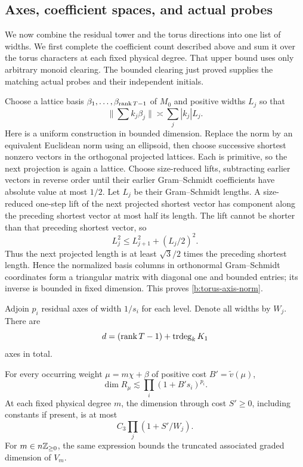 \subsection{Axes, coefficient spaces, and actual probes}

We now combine the residual tower and the torus directions into one list
of widths. We first complete the coefficient count described above and
sum it over the torus characters at each fixed physical degree. That
upper bound uses only arbitrary monoid clearing. The bounded clearing
just proved supplies the matching actual probes and their independent
initials.

Choose a lattice basis \(\beta_1,\ldots,\beta_{\operatorname{rank} T-1}\)
of \(M_0\) and positive widths \(L_j\) so that
\begin{equation}\label{b:torus-axis-norm}
                    \Big\|\sum k_j\beta_j\Big\|
                            \asymp\sum_j|k_j|L_j.
\end{equation}
Here is a uniform construction in bounded dimension.
Replace the norm by an equivalent Euclidean norm using an
ellipsoid, then choose successive shortest nonzero vectors
in the orthogonal projected lattices. Each is primitive, so
the next projection is again a lattice. Choose size-reduced
lifts, subtracting earlier vectors in reverse order until
their earlier Gram--Schmidt coefficients have absolute
value at most \(1/2\). Let \(L_j\) be their Gram--Schmidt
lengths. A size-reduced one-step lift of the next projected shortest vector has
component along the preceding shortest vector at most half its length.
The lift cannot be shorter than that preceding shortest vector, so
\[
              L_j^2\le L_{j+1}^2+(L_j/2)^2.
\]
Thus the next projected length is at least $\sqrt3/2$ times the preceding
shortest length. Hence the normalized basis columns in
orthonormal Gram--Schmidt coordinates form a triangular
matrix with diagonal one and bounded entries; its inverse
is bounded in fixed dimension. This proves
\eqref{b:torus-axis-norm}.

Adjoin \(p_i\) residual axes of width \(1/s_i\) for each level.
Denote all widths by \(W_j\). There are
\[
                    d=(\operatorname{rank} T-1)+\operatorname{trdeg}_kK_1
\]
axes in total.
\begin{proposition}\label{b:coefficient-dimension}
For every occurring weight $\mu=m\chi+\beta$ of positive cost
$B'=\widetilde v(\mu)$,
\begin{equation}\label{eq:C7}
                     \dim R_\mu\lesssim
                           \prod_i(1+B's_i)^{p_i}.
\end{equation}
At each fixed physical degree \(m\), the dimension through
cost \(S'\ge0\), including constants if present, is at most
\begin{equation}\label{eq:C8}
                           C_3\prod_j(1+S'/W_j).
\end{equation}
For \(m\in n\mathbb Z_{\ge0}\), the same expression bounds the
truncated associated graded dimension of \(V_m\).
\end{proposition}

